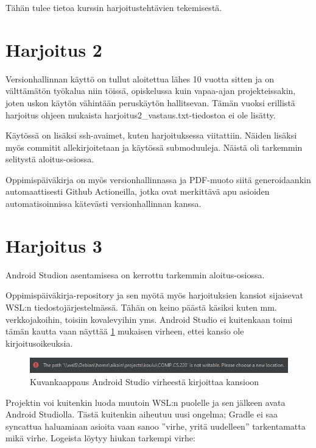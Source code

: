 
Tähän tulee tietoa kurssin harjoitustehtävien tekemisestä.


\section{Harjoitus 2}

Versionhallinnan käyttö on tullut aloitettua lähes 10 vuotta sitten ja on
välttämätön työkalua niin töissä, opiskelussa kuin vapaa-ajan projekteissakin,
joten uskon käytön vähintään peruskäytön hallitsevan. Tämän vuoksi erillistä
harjoitus ohjeen mukaista harjoitus2\_vastaus.txt-tiedostoa ei ole lisätty.

Käytössä on lisäksi ssh-avaimet, kuten harjoituksessa viitattiin. Näiden
lisäksi myös commitit allekirjoitetaan ja käytössä submoduuleja. Näistä oli
tarkemmin selitystä aloitus-osiossa.

Oppimispäiväkirja on myös versionhallinnassa ja PDF-muoto siitä generoidaankin
automaattisesti Github Actioneilla, jotka ovat merkittävä apu asioiden
automatisoinnissa kätevästi versionhallinnan kanssa.

\section{Harjoitus 3}

Android Studion asentamisesa on kerrottu tarkemmin aloitus-osiossa.

Oppimispäiväkirja-repository ja sen myötä myös harjoituksien kansiot
sijaisevat WSL:n tiedostojärjestelmässä. Tähän on keino päästä käsiksi kuten
mm. verkkojakoihin, toisiin kovalevyihin yms. Android Studio ei kuitenkaan
toimi tämän kautta vaan näyttää \ref{fig:android-studio-path-not-writable}
mukaisen virheen, ettei kansio ole kirjoitusoikeuksia.

\begin{figure}[h!]
    \includegraphics[width=\textwidth]{figures/android-studio-path-not-writable.png}
    \caption{Kuvankaappaus Android Studio virheestä kirjoittaa kansioon}
    \label{fig:android-studio-path-not-writable}
\end{figure}

Projektin voi kuitenkin luoda muutoin WSL:n puolelle ja sen jälkeen avata
Android Studiolla. Tästä kuitenkin aiheutuu uusi ongelma; Gradle ei saa
syncattua haluamiaan asioita vaan sanoo ''virhe, yritä uudelleen'' tarkentamatta
mikä virhe. Logeista löytyy hiukan tarkempi virhe:

